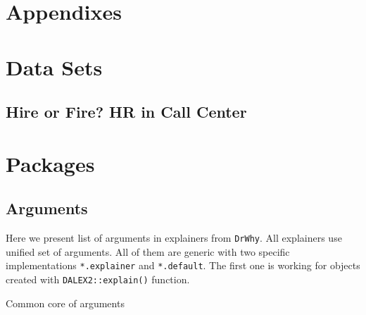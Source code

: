 \documentclass[12pt,]{krantz}
\theoremstyle{definition}
\theoremstyle{definition}
\theoremstyle{definition}
\theoremstyle{remark}
\begin{document}
\hypertarget{appendixes}{%
\section*{Appendixes}\label{appendixes}}

\hypertarget{DataSets}{%
\section{Data Sets}\label{DataSets}}

\hypertarget{HRdataset}{%
\subsection{Hire or Fire? HR in Call Center}\label{HRdataset}}

\hypertarget{Packages}{%
\section{Packages}\label{Packages}}

\hypertarget{arguments}{%
\subsection{Arguments}\label{arguments}}

Here we present list of arguments in explainers from \texttt{DrWhy}. All
explainers use unified set of arguments. All of them are generic with
two specific implementations \texttt{*.explainer} and
\texttt{*.default}. The first one is working for objects created with
\texttt{DALEX2::explain()} function.

Common core of arguments
\end{document}
